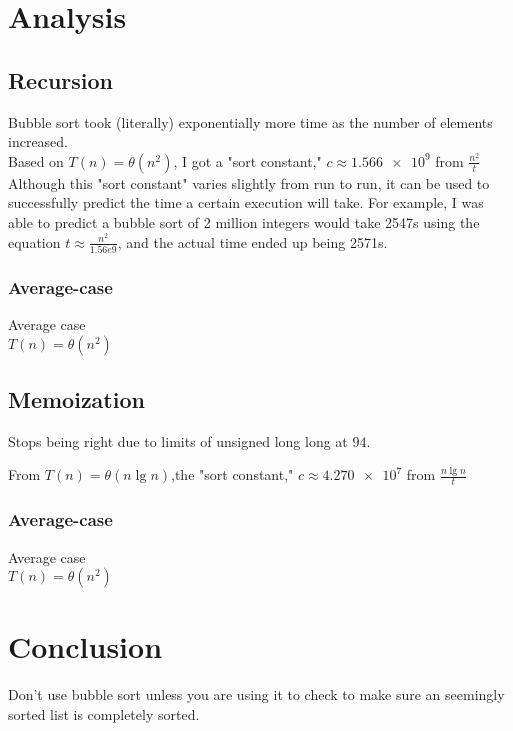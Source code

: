 \documentclass{article}
\begin{document}

\section{Analysis}


\subsection{Recursion}

Bubble sort took (literally) exponentially more time as the number of elements increased. \\

	Based on $T(n) = \theta (n^2)$, I got a "sort constant," $c \approx \num{1.566e9}$ from $\frac{n^2}{t}$ \\

Although this "sort constant" varies slightly from run to run, it can be used to successfully predict the time a certain
execution will take. For example, I was able to predict a bubble sort of 2 million integers would take 2547s using
the equation $t \approx \frac{n^2}{1.56e9}$, and the actual time ended up being 2571s.

\subsubsection{Average-case}

Average case  \\

	$T(n) = \theta (n^2)$

\newpage


\subsection{Memoization}

Stops being right due to limits of unsigned long long at $94$.


	From $T(n) = \theta (n \lg{n})$,the "sort constant," $c \approx \num{4.270e7}$ from $\frac{n \lg{n}}{t}$ \\



\subsubsection{Average-case}

Average case  \\

	$T(n) = \theta (n^2)$




\section{Conclusion}

Don't use bubble sort unless you are using it to check to make sure an seemingly sorted list is completely sorted.
\end{document}

